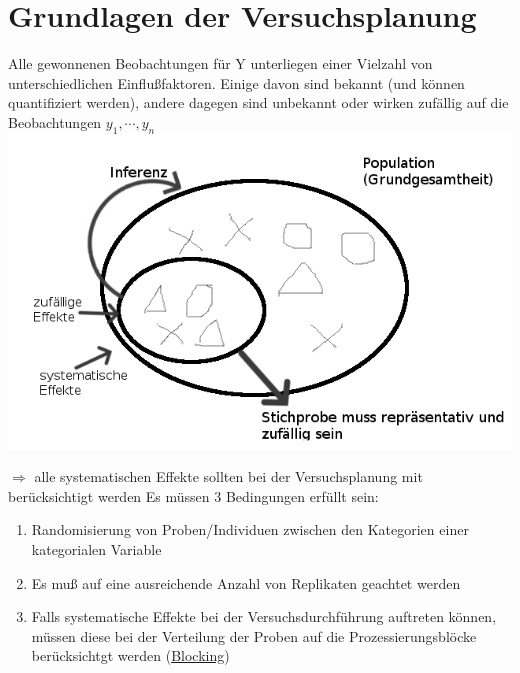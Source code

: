 \chapter{Grundlagen der Versuchsplanung}
Alle gewonnenen Beobachtungen für Y unterliegen einer Vielzahl von unterschiedlichen Einflußfaktoren. Einige davon sind bekannt (und können quantifiziert werden), andere dagegen sind unbekannt oder wirken zufällig auf die Beobachtungen $y_1,\cdots,y_n$ \\
		\includegraphics[scale=0.5]{VorlesungenTexDateien/images/Stichprobe}

$\Rightarrow$ alle systematischen Effekte sollten bei der Versuchsplanung mit berücksichtigt werden 
Es müssen 3 Bedingungen erfüllt sein:
\begin{enumerate}
	\item Randomisierung von Proben/Individuen zwischen den Kategorien einer kategorialen Variable
	\item Es muß auf eine ausreichende Anzahl von Replikaten geachtet werden
	\item Falls systematische Effekte bei der Versuchsdurchführung auftreten können, müssen diese bei der Verteilung der Proben auf die Prozessierungsblöcke berücksichtgt werden (\underline{Blocking})
\end{enumerate}
